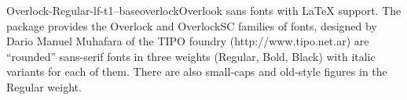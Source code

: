 \documentclass{ddltxtyp}
\begin{document}
\begin{package}{Overlock-Regular-lf-t1--base}{overlock}{Overlook sans fonts with LaTeX support.}
The package provides the Overlock and OverlockSC families of
fonts, designed by Dario Manuel Muhafara of the TIPO foundry
(http://www.tipo.net.ar) are ``rounded'' sans-serif fonts in
three weights (Regular, Bold, Black) with italic variants for
each of them. There are also small-caps and old-style figures
in the Regular weight.
\end{package}

\end{document}
